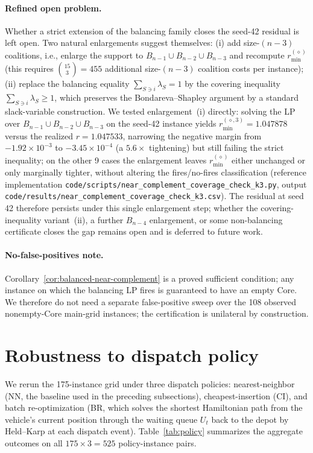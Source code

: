 \documentclass[11pt]{article}
\theoremstyle{plain}
\theoremstyle{definition}
\theoremstyle{remark}
\begin{document}
\paragraph{Refined open problem.} Whether a strict extension of the balancing family closes the seed-42 residual is left open. Two natural enlargements suggest themselves: (i) add size-$(n-3)$ coalitions, i.e., enlarge the support to $B_{n-1}\cup B_{n-2}\cup B_{n-3}$ and recompute $r^{(\diamond)}_{\min}$ (this requires $\binom{15}{3}=455$ additional size-$(n-3)$ coalition costs per instance); (ii) replace the balancing equality $\sum_{S\ni i}\lambda_S=1$ by the covering inequality $\sum_{S\ni i}\lambda_S\ge 1$, which preserves the Bondareva--Shapley argument by a standard slack-variable construction. We tested enlargement~(i) directly: solving the LP over $B_{n-1}\cup B_{n-2}\cup B_{n-3}$ on the seed-42 instance yields $r^{(\diamond,3)}_{\min}=1.047878$ versus the realized $r=1.047533$, narrowing the negative margin from $-1.92\times 10^{-3}$ to $-3.45\times 10^{-4}$ (a $5.6\times$ tightening) but still failing the strict inequality; on the other 9 cases the enlargement leaves $r^{(\diamond)}_{\min}$ either unchanged or only marginally tighter, without altering the fires/no-fires classification (reference implementation \verb|code/scripts/near_complement_coverage_check_k3.py|, output \verb|code/results/near_complement_coverage_check_k3.csv|). The residual at seed 42 therefore persists under this single enlargement step; whether the covering-inequality variant~(ii), a further $B_{n-4}$ enlargement, or some non-balancing certificate closes the gap remains open and is deferred to future work.

\paragraph{No-false-positives note.} Corollary~\ref{cor:balanced-near-complement} is a proved sufficient condition; any instance on which the balancing LP fires is guaranteed to have an empty Core. We therefore do not need a separate false-positive sweep over the 108 observed nonempty-Core main-grid instances; the certification is unilateral by construction.

\section{Robustness to dispatch policy}
\label{secS:robustness-detail}

We rerun the 175-instance grid under three dispatch policies: nearest-neighbor (NN, the baseline used in the preceding subsections), cheapest-insertion (CI), and batch re-optimization (BR, which solves the shortest Hamiltonian path from the vehicle's current position through the waiting queue $U_t$ back to the depot by Held--Karp at each dispatch event). Table~\ref{tab:policy} summarizes the aggregate outcomes on all $175\times 3 = 525$ policy-instance pairs.
\end{document}
